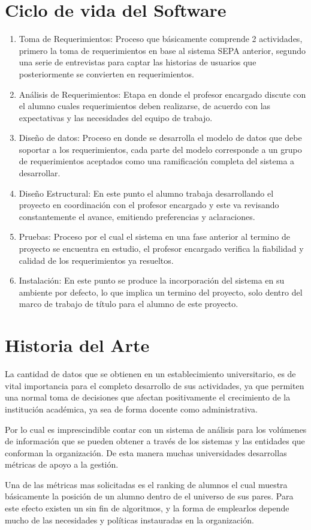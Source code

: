 \documentclass[a4paper,12pt,openany,oneside]{book}
\begin{document}
\section{Ciclo de vida del Software}
\begin{enumerate}
\item Toma de Requerimientos: Proceso que básicamente comprende 2 actividades, primero la toma de requerimientos en base al sistema SEPA anterior, segundo una serie de entrevistas para captar las historias de usuarios que posteriormente se convierten en requerimientos.
\item Análisis de Requerimientos: Etapa en donde el profesor encargado discute con el alumno cuales requerimientos deben realizarse, de acuerdo con las expectativas y las necesidades del equipo de trabajo.
\item Diseño de datos: Proceso en donde se desarrolla el modelo de datos que debe soportar a los requerimientos, cada parte del modelo corresponde a un grupo de requerimientos aceptados como una ramificación completa del sistema a desarrollar.
\item Diseño Estructural: En este punto el alumno trabaja desarrollando el proyecto en coordinación con el profesor encargado y este va revisando constantemente el avance, emitiendo preferencias y aclaraciones.
\item Pruebas: Proceso por el cual el sistema en una fase anterior al termino de proyecto se encuentra en estudio, el profesor encargado verifica la fiabilidad y calidad de los requerimientos ya resueltos.
\item Instalación: En este punto se produce la incorporación del sistema en su ambiente por defecto, lo que implica un termino del proyecto, solo dentro del marco de trabajo de título para el alumno de este proyecto.
\end{enumerate}
\section{Historia del Arte}
La cantidad de datos que se obtienen en un establecimiento universitario, es de vital importancia para el completo desarrollo de sus actividades, ya que permiten una normal toma de decisiones que afectan positivamente el crecimiento de la institución académica, ya sea de forma docente como administrativa. 

Por lo cual es imprescindible contar con un sistema de análisis para los volúmenes de información que se pueden obtener a través de los sistemas y las entidades que conforman la organización. De esta manera muchas universidades desarrollas métricas de apoyo a la gestión.

Una de las métricas mas solicitadas es el ranking de alumnos el cual muestra básicamente la posición de un alumno dentro de el universo de sus pares. Para este efecto existen un sin fin de algoritmos, y la forma de emplearlos depende mucho de las necesidades y políticas instauradas en la organización.
\end{document}
